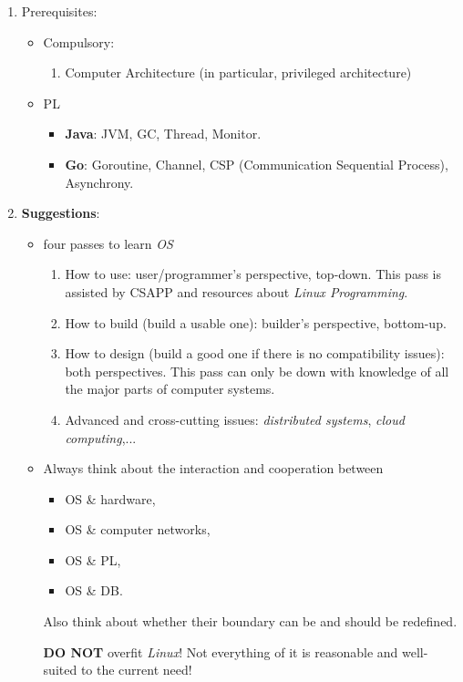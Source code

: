 \documentclass{article}
\begin{document}
\begin{enumerate}
    \item Prerequisites:
    \begin{itemize}
        \item Compulsory:
        \begin{enumerate}
        \item Computer Architecture (in particular, privileged architecture)
        \end{enumerate}
        \item PL
        \begin{itemize}
        \item \textbf{Java}: JVM, GC, Thread, Monitor.
        \item \textbf{Go}: Goroutine, Channel, CSP (Communication Sequential Process), Asynchrony.
        \end{itemize}
    \end{itemize}
    \item \textbf{Suggestions}:
    \begin{itemize}
        \item four passes to learn \emph{OS}
            \begin{enumerate}
                \item How to use: user/programmer's perspective, top-down.
                This pass is assisted by CSAPP and resources about \emph{Linux Programming}.
                \item How to build (build a usable one): builder's perspective, bottom-up.
                \item How to design (build a good one if there is no compatibility issues): both perspectives.
                This pass can only be down with knowledge of all the major parts of computer systems.
                \item Advanced and cross-cutting issues:
                \emph{distributed systems}, \emph{cloud computing},...
            \end{enumerate}
        \item Always think about the interaction and cooperation between
        \begin{itemize}
            \item OS \& hardware,
            \item OS \& computer networks,
            \item OS \& PL,
            \item OS \& DB.
        \end{itemize}
        Also think about whether their boundary can be and should be redefined.
        
        \textbf{DO NOT} overfit \emph{Linux}!
        Not everything of it is reasonable and well-suited to the current need!
    \end{itemize}

\end{enumerate}
\end{document}
